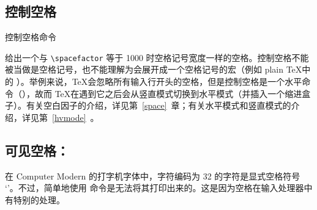 \documentclass{book}
\begin{document}
\subsection{控制空格}

控制空格命令 \n{\cs{\textvisiblespace}}\cstoidx{}\par 给出一个与 \verb=\spacefactor= 等于 1000 时空格记号宽度一样的空格。控制空格不能被当做是空格记号，也不能理解为会展开成一个空格记号的宏（例如 plain \TeX 中的 ）。举例来说，\TeX 会忽略所有输入行开头的空格，但是控制空格是一个水平命令（），故而 \TeX 在遇到它之后会从竖直模式切换到水平模式（并插入一个缩进盒子）。有关空白因子的介绍，详见第~\ref{space}~章；有关水平模式和竖直模式的介绍，详见第~\ref{hvmode}~。

\subsection{可见空格：\textvisiblespace}

在 Computer Modern 的打字机字体中，字符编码为 32 的字符是显式空格符号 `\textvisiblespace'。不过，简单地使用  命令是无法将其打印出来的。这是因为空格在输入处理器中有特别的处理。
\end{document}
